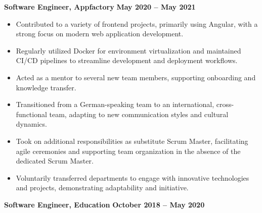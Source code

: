 \documentclass[10pt, a4paper]{cvhari}
\begin{document}
\smallskip
\divider
\smallskip

    \textbf{Software Engineer, Appfactory} \hfill \textbf{May 2020 -- May 2021}

    \vspace{0.2em}
    \begin{itemize}
        \item Contributed to a variety of frontend projects, primarily using Angular, with a strong focus on modern web application development.

        \item Regularly utilized Docker for environment virtualization and maintained CI/CD pipelines to streamline development and deployment workflows.

        \item Acted as a mentor to several new team members, supporting onboarding and knowledge transfer.

        \item Transitioned from a German-speaking team to an international, cross-functional team, adapting to new communication styles and cultural dynamics.

        \item Took on additional responsibilities as substitute Scrum Master, facilitating agile ceremonies and supporting team organization in the absence of the dedicated Scrum Master.

        \item Voluntarily transferred departments to engage with innovative technologies and projects, demonstrating adaptability and initiative.

    \end{itemize}


\smallskip
\divider
\smallskip

    \textbf{Software Engineer, Education} \hfill \textbf{October 2018 -- May 2020}
\end{document}
